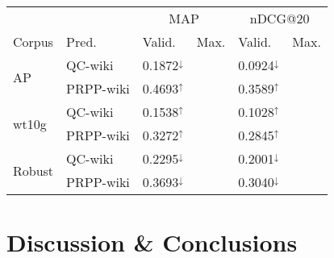 \documentclass{sig-alternate}
\begin{document}
\begin{table}
\begin{tabular}{|l|l|l|l|l|l|} \hline
& & \multicolumn{2}{c|}{MAP} & \multicolumn{2}{c|}{nDCG@20} \\ \cline{3-6}
Corpus & Pred. & Valid. & Max. & Valid. & Max. \\ \hline\hline
\multirow{2}{*}{AP} & QC-wiki & 0.1872$^{\downarrow}$ & & 0.0924$^{\downarrow}$ & \\ \cline{2-6}
& PRPP-wiki & 0.4693$^{\uparrow}$ & & 0.3589$^{\uparrow}$ & \\ \hline\hline
\multirow{2}{*}{wt10g} & QC-wiki & 0.1538$^{\uparrow}$ & & 0.1028$^{\uparrow}$ & \\ \cline{2-6}
& PRPP-wiki & 0.3272$^{\uparrow}$ & & 0.2845$^{\uparrow}$ & \\ \hline\hline
\multirow{2}{*}{Robust} & QC-wiki & 0.2295$^{\downarrow}$ & & 0.2001$^{\downarrow}$ & \\ \cline{2-6}
& PRPP-wiki & 0.3693$^{\downarrow}$ & & 0.3040$^{\downarrow}$ & \\ \hline
\end{tabular}
\caption{}
\label{table.results.wiki.kendall}
\end{table}

\section{Discussion \& Conclusions}\label{section.conclusions}


  
\end{document}
